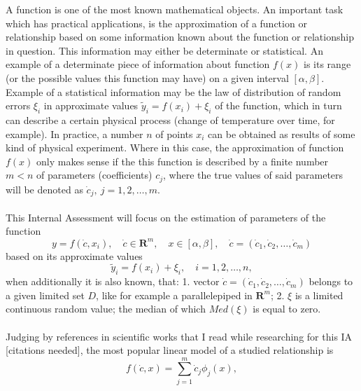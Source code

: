 A function is one of the most known mathematical objects. An important task which has practical applications, is the approximation of a function or relationship based on some information known about the function or relationship in question. This information may either be determinate or statistical. An example of a determinate piece of information about function $f(x)$ is its range (or the possible values this function may have) on a given interval $[\alpha,\beta]$. Example of a statistical information may be the law of distribution of random errors $\xi_{i}$ in approximate values $\tilde{y}_{i} = f(x_{i})+\xi_{i}$ of the function, which in turn can describe a certain physical process (change of temperature over time, for example). In practice, a number $n$ of points $x_{i}$ can be obtained as results of some kind of physical experiment. Where in this case, the approximation of function $f(x)$ only makes sense if the this function is described by a finite number $m<n$ of parameters (coefficients) $c_{j}$, where the true values of said parameters will be denoted as $\dot{c}_{j}, \ j=1,2,\dots,m.$ \\
\\
This Internal Assessment will focus on the estimation of parameters of the function 
\begin{equation} 
y = f(\dot{c},x_{i}),\quad \dot{c} \in \boldsymbol{R}^{m},\quad x \in [\alpha,\beta],\quad \dot{c} = (\dot{c}_{1}, \dot{c}_{2},\dots,\dot{c}_{m}) \label{301} \tag*{(\theequation)\protect\footnotemark}
\end{equation}
based on its approximate values
\begin{equation}
\tilde{y}_{i} = f(x_{i})+\xi_{i}, \quad i=1,2,\dots,n ,
\end{equation}
when additionally it is also known, that: 1. vector $\dot{c} = (\dot{c}_{1}, \dot{c}_{2},\dots,\dot{c}_{m})$ belongs to a given limited set $D$, like for example a parallelepiped in $\boldsymbol{R}^{m}$; 2. $\xi$ is a limited continuous random value; the median of which $Med(\xi)$ is equal to zero. \\
\\
Judging by references in scientific works that I read while researching for this IA [citations needed], the most popular linear model of a studied relationship is
\begin{equation}
f(\dot{c},x)= \sum\limits_{j=1}^{m} \dot{c}_{j} \phi_{j}(x), \label{functionform}
\end{equation}

